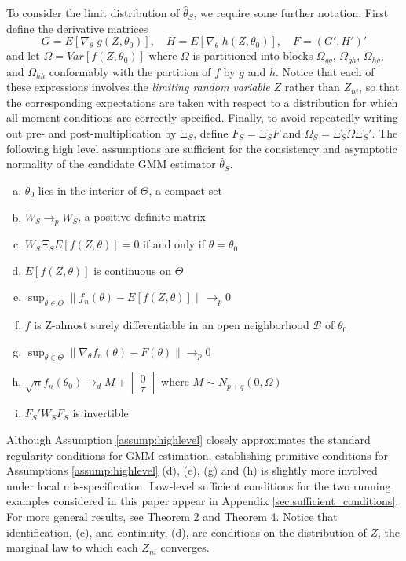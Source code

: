 To consider the limit distribution of $\widehat{\theta}_S$, we require some further notation. 
First define the derivative matrices
	$$G = E\left[\nabla_{\theta} \; g(Z,\theta_0)\right], \quad H = E\left[\nabla_{\theta} \; h(Z,\theta_0)\right], \quad F = (G', H')'$$
and let $\Omega = Var\left[ f(Z,\theta_0) \right]$ where $\Omega$ is partitioned into blocks $\Omega_{gg}$, $\Omega_{gh}$, $\Omega_{hg}$, and $\Omega_{hh}$ conformably with the partition of $f$ by $g$ and $h$. 
Notice that each of these expressions involves the \emph{limiting random variable} $Z$ rather than $Z_{ni}$, so that the corresponding expectations are taken with respect to a distribution for which all moment conditions are correctly specified. 
Finally, to avoid repeatedly writing out pre- and post-multiplication by $\Xi_S$, define $F_S = \Xi_S F$ and $\Omega_S = \Xi_S \Omega\Xi_S'$. 
The following high level assumptions are sufficient for the consistency and asymptotic normality of the candidate GMM estimator $\widehat{\theta}_S$. 
\begin{assump}
\label{assump:highlevel} 
\mbox{}
	\begin{enumerate}[(a)]
		\item $\theta_0$ lies in the interior of $\Theta$, a compact set
		\item $\widetilde{W}_S \rightarrow_{p} W_S$, a positive definite matrix
		\item $W_S \Xi_S E[f(Z,\theta)]=0$ if and only if $\theta = \theta_0$
		\item $E[f(Z,\theta)]$ is continuous on $\Theta$
		\item $\sup_{\theta \in \Theta}\| f_n(\theta)- E[f(Z,\theta)]\|\rightarrow_{p} 0$
		\item $f$ is Z-almost surely differentiable in an open neighborhood $\mathcal{B}$ of $\theta_0$
		\item $\sup_{\theta \in \Theta} \|\nabla_{\theta}f_n(\theta) - F(\theta)\|\rightarrow_{p} 0$
		\item $\sqrt{n}f_n(\theta_0) \rightarrow_d  M + \left[\begin{array}{c}0\\ \tau \end{array} \right]$ where $M \sim N_{p+q}\left(0, \Omega \right)$
		\item $F_S'W_SF_S$ is invertible
	\end{enumerate}
\end{assump}

Although Assumption \ref{assump:highlevel} closely approximates the standard regularity conditions for GMM estimation, establishing primitive conditions for Assumptions \ref{assump:highlevel} (d), (e), (g) and (h) is slightly more involved under local mis-specification. 
Low-level sufficient conditions for the two running examples considered in this paper appear in Appendix \ref{sec:sufficient_conditions}.
For more general results, see \cite{Andrews1988} Theorem 2 and \cite{Andrews1992} Theorem 4.  
Notice that identification, (c), and continuity, (d), are conditions on the distribution of $Z$, the marginal law to which each $Z_{ni}$ converges. 

